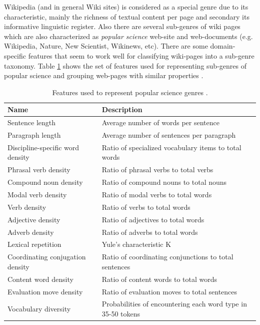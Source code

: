 Wikipedia (and in general Wiki sites) is considered as a special genre due to its characteristic, mainly the richness of textual content per page and secondary its informative linguistic register. Also there are several sub-genres of wiki pages which are also characterized as \textit{popular science} web-site and web-documents (e.g. Wikipedia, Nature, New Scientist, Wikinews, etc). There are some domain-specific features that seem to work well for classifying wiki-pages into a sub-genre taxonomy. Table \ref{chap:relevant_work:tbl:pop_science_features} shows the set of features used for representing sub-genres of popular science and grouping web-pages with similar properties \parencite{lieungnapar2017genre}. 

\begin{table}[t]
	\center
	\caption {Features used to represent popular science genres \parencite{lieungnapar2017genre}.}\label{chap:relevant_work:tbl:pop_science_features}
	\begin{tabular}{p{4cm}p{8cm}}
		\hline
		Name & Description \\
		\hline
		Sentence length & Average number of words per sentence \\
        Paragraph length & Average number of sentences per paragraph \\
        Discipline-specific word density & Ratio of specialized vocabulary items to total words \\
        Phrasal verb density & Ratio of phrasal verbs to total verbs \\
        Compound noun density & Ratio of compound nouns to total nouns \\
        Modal verb density & Ratio of modal verbs to total words \\
        Verb density &  Ratio of verbs to total words \\
        Adjective density & Ratio of adjectives to total words \\
        Adverb density & Ratio of adverbs to total words \\
        Lexical repetition & Yule's characteristic K \\
        Coordinating conjugation density & Ratio of coordinating conjunctions to total sentences \\
        Content word density & Ratio of content words to total words \\
        Evaluation move density & Ratio of evaluation moves to total sentences \\
        Vocabulary diversity & Probabilities of encountering each word type in 35-50 tokens \\

\end{tabular}
\end{table}

